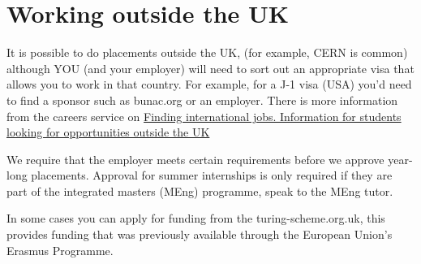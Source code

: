 \documentclass[
]{book}
\begin{document}
\chapter{Working outside the UK}\label{notuk}

It is possible to do placements outside the UK, (for example, CERN is common) although YOU (and your employer) will need to sort out an appropriate visa that allows you to work in that country. For example, for a J-1 visa (USA) you'd need to find a sponsor such as bunac.org or an employer. There is more information from the careers service on \href{https://www.careers.manchester.ac.uk/international/internationaljobs/}{Finding international jobs. Information for students looking for opportunities outside the UK} \citep{interjobs}

We require that the employer meets certain requirements before we approve year-long placements. Approval for summer internships is only required if they are part of the integrated masters (MEng) programme, speak to the MEng tutor.

In some cases you can apply for funding from the turing-scheme.org.uk, this provides funding that was previously available through the European Union's Erasmus Programme.

  
\end{document}
